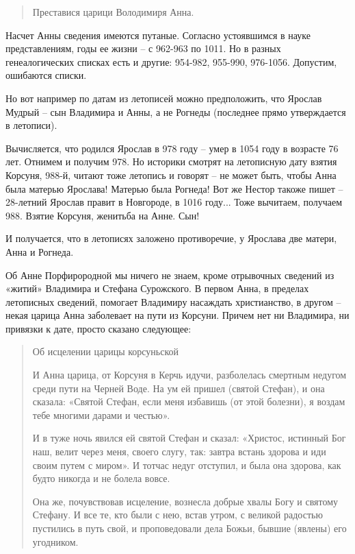 \begin{quotation}
Преставися царици Володимиря Анна.
\end{quotation}

Насчет Анны сведения имеются путаные. Согласно устоявшимся в науке представлениям, годы ее жизни – с 962-963 по 1011. Но в разных генеалогических списках есть и другие: 954-982, 955-990, 976-1056. Допустим, ошибаются списки.

Но вот например по датам из летописей можно предположить, что Ярослав Мудрый – сын Владимира и Анны, а не Рогнеды (последнее прямо утверждается в летописи). 

Вычисляется, что родился Ярослав в 978 году – умер в 1054 году в возрасте 76 лет. Отнимем и получим 978. Но историки смотрят на летописную дату взятия Корсуня, 988-й, читают тоже летопись и говорят – не может быть, чтобы Анна была матерью Ярослава! Матерью была Рогнеда! Вот же Нестор такоже пишет – 28-летний Ярослав правит в Новгороде, в 1016 году... Тоже вычитаем, получаем 988. Взятие Корсуня, женитьба на Анне. Сын! 

И получается, что в летописях заложено противоречие, у Ярослава две матери, Анна и Рогнеда.

Об Анне Порфирородной мы ничего не знаем, кроме отрывочных сведений из «житий» Владимира и Стефана Сурожского. В первом Анна, в пределах летописных сведений, помогает Владимиру насаждать христианство, в другом – некая царица Анна заболевает на пути из Корсуни.  Причем нет ни Владимира, ни привязки к дате, просто сказано следующее:

\begin{quotation}
Об исцелении царицы корсуньской 

И Анна царица, от Корсуня в Керчь идучи, разболелась смертным недугом среди пути на Черней Воде. На ум ей пришел (святой Стефан), и она сказала: «Святой Стефан, если меня избавишь (от этой болезни), я воздам тебе многими дарами и че­стью».

И в туже ночь явился ей святой Стефан и сказал: «Христос, истинный Бог наш, велит через меня, своего слугу, так: завтра встань здорова и иди своим путем с миром». И тотчас недуг отступил, и была она здорова, как будто никогда и не болела вовсе. 

Она же, почувствовав исцеление, вознесла добрые хвалы Богу и святому Стефану. И все те, кто были с нею, встав утром, с великой радостью пустились в путь свой, и проповедовали дела Божьи, бывшие (явлены) его угодником.
\end{quotation}

